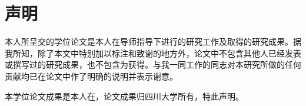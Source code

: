 \chapter{声明}
本人所呈交的学位论文是本人在导师指导下进行的研究工作及取得的研究成果。据我所知，除了本文中特别加以标注和致谢的地方外，论文中不包含其他人已经发表或撰写过的研究成果，也不包含为获得。与我一同工作的同志对本研究所做的任何贡献均已在论文中作了明确的说明并表示谢意。


本学位论文成果是本人在，论文成果归四川大学所有，特此声明。
\vspace{4cm}
\autograph
